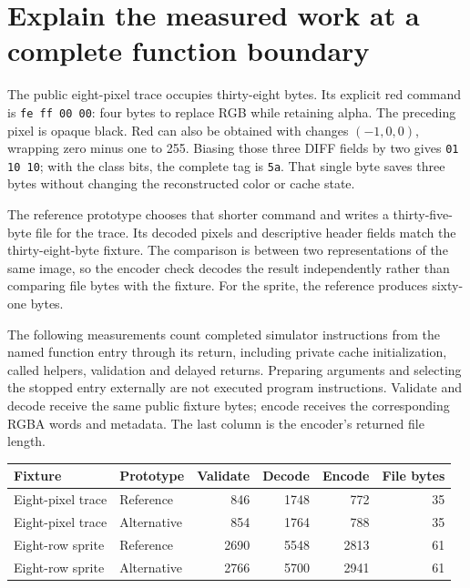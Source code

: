 \section{Explain the measured work at a complete function boundary}
The public eight-pixel trace occupies thirty-eight bytes. Its explicit red command is
\texttt{fe ff 00 00}: four bytes to replace RGB while retaining alpha. The preceding
pixel is opaque black. Red can also be obtained with changes \((-1,0,0)\), wrapping
zero minus one to 255. Biasing those three DIFF fields by two gives \texttt{01 10 10};
with the class bits, the complete tag is \texttt{5a}. That single byte saves three
bytes without changing the reconstructed color or cache state.

The reference prototype chooses that shorter command and writes a thirty-five-byte
file for the trace. Its decoded pixels and descriptive header fields match the
thirty-eight-byte fixture. The comparison is between two representations of the same
image, so the encoder check decodes the result independently rather than comparing
file bytes with the fixture. For the sprite, the reference produces sixty-one bytes.

The following measurements count completed simulator instructions from the named
function entry through its return, including private cache initialization, called
helpers, validation and delayed returns. Preparing arguments and selecting the stopped
entry externally are not executed program instructions. Validate and decode receive
the same public fixture bytes; encode receives the corresponding RGBA words and
metadata. The last column is the encoder's returned file length.

\begin{center}
  \small
  \begin{tabular}{llrrrr}
    Fixture           & Prototype   & Validate & Decode & Encode & File bytes \\
    \hline
    Eight-pixel trace & Reference   & 846      & 1748   & 772    & 35         \\
    Eight-pixel trace & Alternative & 854      & 1764   & 788    & 35         \\
    Eight-row sprite  & Reference   & 2690     & 5548   & 2813   & 61         \\
    Eight-row sprite  & Alternative & 2766     & 5700   & 2941   & 61         \\
  \end{tabular}
\end{center}

